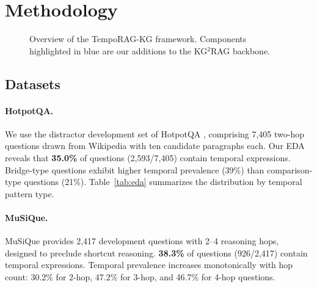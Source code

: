 \documentclass[11pt]{article}
\begin{document}
\section{Methodology}

\begin{figure}[t]
  \centering
  \caption{Overview of the TempoRAG-KG framework. Components highlighted in
  blue are our additions to the KG$^2$RAG backbone.}
  \label{fig:architecture}
\end{figure}

\subsection{Datasets}

\paragraph{HotpotQA.}
We use the distractor development set of HotpotQA \cite{yang2018hotpotqa},
comprising 7,405 two-hop questions drawn from Wikipedia with ten candidate
paragraphs each. Our EDA reveals that \textbf{35.0\%} of questions
(2,593/7,405) contain temporal expressions. Bridge-type questions exhibit
higher temporal prevalence (39\%) than comparison-type questions (21\%).
Table~\ref{tab:eda} summarizes the distribution by temporal pattern type.

\paragraph{MuSiQue.}
MuSiQue \cite{trivedi2022musique} provides 2,417 development questions
with 2--4 reasoning hops, designed to preclude shortcut reasoning.
\textbf{38.3\%} of questions (926/2,417) contain temporal expressions.
Temporal prevalence increases monotonically with hop count:
30.2\% for 2-hop, 47.2\% for 3-hop, and 46.7\% for 4-hop questions.
\end{document}
